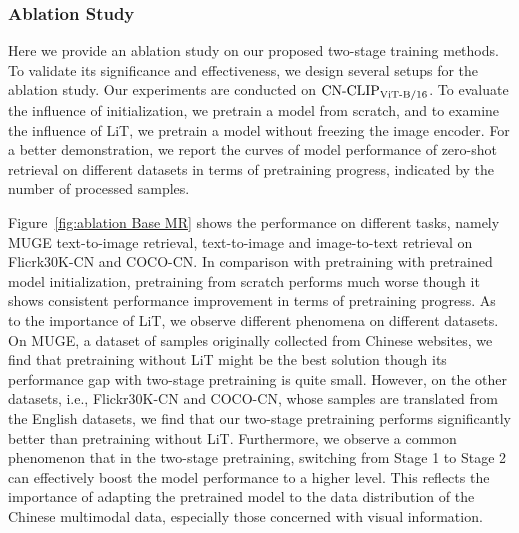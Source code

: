 \documentclass[11pt]{article}
\begin{document}
 \subsubsection{Ablation Study}
Here we provide an ablation study on our proposed two-stage training methods. 
To validate its significance and effectiveness, we design several setups for the ablation study. 
Our experiments are conducted on $\text{CN-CLIP}\rm_{ViT\text{-}B/16}$. 
To evaluate the influence of initialization, we pretrain a model from scratch, and to examine the influence of LiT, we pretrain a model without freezing the image encoder. 
For a better demonstration, we report the curves of model performance of zero-shot retrieval on different datasets in terms of pretraining progress, indicated by the number of processed samples. 

Figure~\ref{fig:ablation Base MR} shows the performance on different tasks, namely MUGE text-to-image retrieval, text-to-image and image-to-text retrieval on Flicrk30K-CN and COCO-CN. 
In comparison with pretraining with pretrained model initialization, pretraining from scratch performs much worse though it shows consistent performance improvement in terms of pretraining progress. 
As to the importance of LiT, we observe different phenomena on different datasets. On MUGE, a dataset of samples originally collected from Chinese websites, we find that pretraining without LiT might be the best solution though its performance gap with two-stage pretraining is quite small. 
However, on the other datasets, i.e., Flickr30K-CN and COCO-CN, whose samples are translated from the English datasets, we find that our two-stage pretraining performs significantly better than pretraining without LiT. 
Furthermore, we observe a common phenomenon that in the two-stage pretraining, switching from Stage 1 to Stage 2 can effectively boost the model performance to a higher level. 
This reflects the importance of adapting the pretrained model to the data distribution of the Chinese multimodal data, especially those concerned with visual information. 
\end{document}
